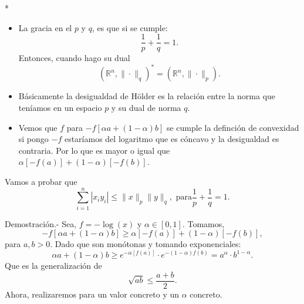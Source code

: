 \begin{paracol}{2}
\switchcolumn[1]*{\noindent\scriptsize
    \begin{itemize}
	\item La gracia en el $p$ y $q$, es que si se cumple:
	    $$\dfrac{1}{p}+\dfrac{1}{q}=1.$$
	Entonces, cuando hago su dual 
	$$\left(\mathbb{R}^n,\|\cdot\|_q\right)^*=\left(\mathbb{R}^n,\|\cdot\|_p\right).$$
	\item Básicamente la desigualdad de Hölder es la relación entre la norma que teníamos en un espacio $p$ y su dual de norma $q$.
	\item Vemos que $f$ para $-f\left[\alpha a + (1-\alpha)b\right]$ se cumple la definción de convexidad si pongo $-f$ estaríamos del logaritmo que es cóncavo y la desigualdad es contraria. Por lo que es mayor o igual que $ \alpha \left[-f(a)\right]+(1-\alpha)\left[-f(b)\right]$.
    \end{itemize}
}
\switchcolumn[0]\noindent
\begin{proposicion} Vamos a probar que
    $$\sum_{i=1}^n |x_iy_i|\leq \|x\|_p\|y\|_q, \text{ para} \dfrac{1}{p}+\dfrac{1}{q}=1.$$

    Demostración.-\; Sea, $f=-\log(x)$ y $\alpha\in [0,1]$. Tomamos,
    $$-f\left[\alpha a + (1-\alpha)b\right]\geq \alpha \left[-f(a)\right]+(1-\alpha)\left[-f(b)\right],$$
    para $a,b>0$.
    Dado que son monótonas y tomando exponenciales:
    $$\alpha a +(1-\alpha)b\geq e^{-\alpha\left[f(a)\right]}\cdot e^{-(1-\alpha)f(b)}=a^\alpha\cdot b^{1-\alpha}.$$
    Que es la generalización de 
    $$\sqrt{ab}\leq \dfrac{a+b}{2}.$$
    Ahora, realizaremos para un valor concreto y un $\alpha$ concreto. 


\end{proposicion}
\end{paracol}
